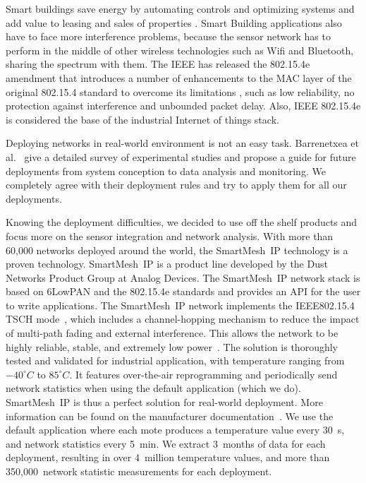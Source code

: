 \documentclass{elsarticle}
\newcommand{\smip}                {SmartMesh~IP\xspace}
\newcommand{\building}            {Smart Building\xspace}
\begin{document}
Smart buildings save energy by automating controls and optimizing systems and add value to leasing and sales of properties \cite{king2017smart}. \building applications also have to face more interference problems, because the sensor network has to perform in the middle of other wireless technologies such as Wifi and Bluetooth, sharing the spectrum with them. 
The IEEE has released the 802.15.4e amendment that
introduces a number of enhancements to the MAC
layer of the original 802.15.4 standard to overcome its limitations \cite{de2016ieee}, 
such as low reliability, no protection against interference and unbounded packet delay. 
Also, IEEE 802.15.4e is considered the base of the industrial Internet of things stack.

Deploying networks in real-world environment is not an easy task.
Barrenetxea et al.~\cite{barrenetxea08hitchhiker} give a detailed survey of experimental studies and propose a guide for future deployments from system conception to data analysis and monitoring.
We completely agree with their deployment rules and try to apply them for all our deployments.

Knowing the deployment difficulties, we decided to use off the shelf products and focus more on the sensor integration and network analysis.
With more than 60,000 networks deployed around the world, the \smip technology is a proven technology.
\smip is a product line developed by the Dust Networks Product Group at Analog Devices.
The \smip network stack is based on 6LowPAN and the 802.15.4e standards and provides an API for the user to write applications.
The \smip network implements the IEEE802.15.4 TSCH mode~\cite{std_ieee802154_2015}, which includes a channel-hopping mechanism to reduce the impact of multi-path fading and external interference.
This allows the network to be highly reliable, stable, and extremely low power~\cite{watteyne10mitigating,watteyne09reliability}.
The solution is thoroughly tested and validated for industrial application, with temperature ranging from $-40^{\circ}C$ to $85^{\circ}C$.
It features over-the-air reprogramming and periodically send network statistics when using the default application (which we do).
\smip is thus a perfect solution for real-world deployment.
More information can be found on the manufacturer documentation~\cite{smip_app_note}.
We use the default application where each mote produces a temperature value every 30~s, and network statistics every 5~min.
We extract 3~months of data for each deployment, resulting in over 4~million temperature values, and more than 350,000~network statistic measurements for each deployment.
\end{document}
